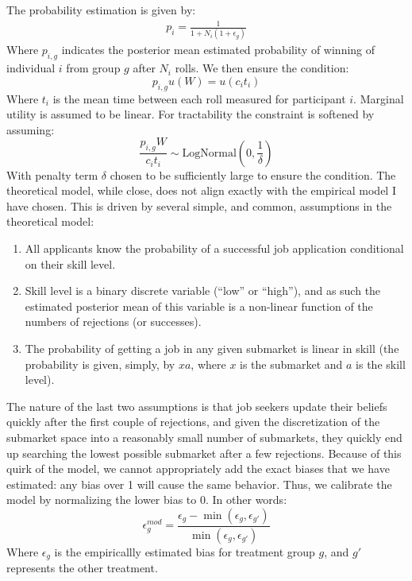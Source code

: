 \documentclass[a4paper,12pt]{article}
\begin{document}
The probability estimation is given by:
\begin{align*}
  p_{i} = \frac{1}{1 + N_i(1 + \epsilon_g)}
\end{align*}
Where $p_{i,g}$ indicates the posterior mean estimated probability of winning of individual $i$ from group $g$ after $N_i$ rolls. We then ensure the condition:
$$
p_{i,g} u\left( W \right) = u\left( c_it_i \right)
$$
Where $t_i$ is the mean time between each roll measured for participant $i$. Marginal utility is assumed to be linear. For tractability the constraint is softened by assuming:
$$
\frac{p_{i,g}W}{c_it_i} \sim \text{LogNormal}(0, \frac{1}{\delta})
$$
With penalty term $\delta$ chosen to be sufficiently large to ensure the condition. The theoretical model, while close, does not align exactly with the empirical model I have chosen. This is driven by several simple, and common, assumptions in the theoretical model:
%
\begin{enumerate}
\item All applicants know the probability of a successful job application conditional on their skill level.
\item Skill level is a binary discrete variable (``low'' or ``high''), and as such the estimated posterior mean of this variable is a non-linear function of the numbers of rejections (or successes).
\item The probability of getting a job in any given submarket is linear in skill (the probability is given, simply, by $xa$, where $x$ is the submarket and $a$ is the skill level).
\end{enumerate}

The nature of the last two assumptions is that job seekers update their beliefs quickly after the first couple of rejections, and given the discretization of the submarket space into a reasonably small number of submarkets, they quickly end up searching the lowest possible submarket after a few rejections. Because of this quirk of the model, we cannot appropriately add the exact biases that we have estimated: any bias over 1 will cause the same behavior. Thus, we calibrate the model by normalizing the lower bias to 0. In other words:
%
\begin{equation} \label {eq:epsilon-model}
\epsilon^{mod}_{g} = \frac{\epsilon_g - \min(\epsilon_g, \epsilon_{g'})}{\min (\epsilon_g, \epsilon_{g'})}
\end{equation}
%
Where $\epsilon_{g}$ is the empiricallly estimated bias for treatment group $g$, and $g'$ represents the other treatment.
\end{document}
